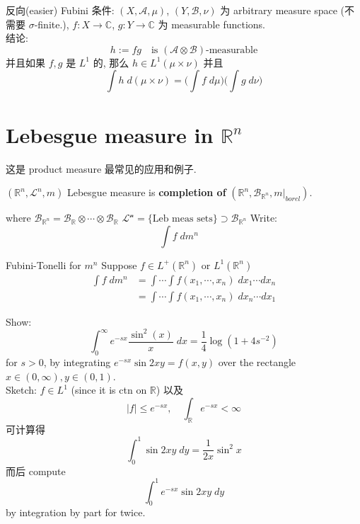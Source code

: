 \documentclass[lang=cn,11pt]{elegantbook}
\begin{document}
\begin{theorem}{反向(easier) Fubini}
条件: $(X,\mathcal{A},\mu)$, $(Y,\mathcal{B}, \nu)$ 为 arbitrary measure space (不需要 $\sigma$-finite.), $f:X\to \mathbb{C}$, $g:Y \to \mathbb{C}$ 为 measurable functions.\\
结论: \[
h:= fg  \quad \text{is } (\mathcal{A} \otimes \mathcal{B}) \text{-measurable}
\]
并且如果 $f,g$ 是 $L^1$ 的, 那么 $h \in L^1(\mu \times \nu)$ 并且 \[
\int h \; d(\mu\times \nu) = \Big( \int f \; d\mu \Big)\Big( \int g \; d\nu \Big)
\]
\end{theorem}
 

\section{Lebesgue measure in $\mathbb{R}^n$}
这是 product measure 最常见的应用和例子. 
\begin{definition}
    $(\mathbb{R}^n, \mathcal{L}^n, m)$ Lebesgue measure is \textbf{completion of } $(\mathbb{R}^n, \mathcal{B}_{\mathbb{R}^n}, m|_{borel})$. 
\end{definition}
where $ \mathcal{B}_{\mathbb{R}^n} =  \mathcal{B}_{\mathbb{R}} \otimes \cdots \otimes \mathcal{B}_{\mathbb{R}}  $
\(\mathcal{L^n }  = \{ \text{Leb meas sets} \}  \supset  \mathcal{B}_{\mathbb{R}^n}\)
Write: \[  \int f \;d m^n   \quad 
\]


\begin{theorem}{Fubini-Tonelli for $m^n$}
    Suppose $f \in L^+(\mathbb{R}^n)$ or $L^1(\mathbb{R}^n)$
\begin{align}
\int f \; dm^n &= \int \cdots \int f(x_1, \cdots, x_n) 
\; dx_1 \cdots dx_n        \\
& = \int \cdots \int f(x_1, \cdots, x_n) 
\; dx_n \cdots dx_1
\end{align}
\end{theorem}

\begin{example}
    Show: \[
    \int_0^\infty e^{-sx} \frac{\sin^2(x)}{x} \; dx = \frac{1}{4} \log(1+ 4s^{-2})
    \]
for $s > 0$, by integrating $e^{-sx} \sin 2xy = f(x,y)$ over the rectangle $x \in (0,\infty), y \in (0,1)$.\\
Sketch: $f \in L^1$ (since it is ctn on $\mathbb{R}$)
以及 \[
|f| \leq e^{-sx}, \quad \int_{\mathbb{R}} e^{-sx} < \infty
\]
可计算得 \[
\int_0 ^1 \sin 2xy \; dy = \frac{1}{2x} \sin^2 x
\]
而后 compute \[
\int_0 ^1    e^{-sx} \sin 2xy \; dy
\] by integration by part for twice.
\end{example}
\end{document}
